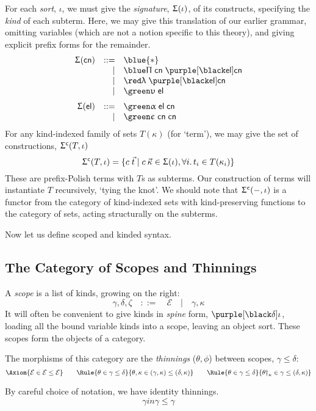\documentclass[natbib]{article}
\newcommand{\type}{\blue{\ast}}
\newcommand{\EC}{\mathcal{E}}
\begin{document}
\newcommand{\Sg}{\Upsigma}
For each \emph{sort}, $\iota$, we must give the \emph{signature}, $\Sg(\iota)$, of its constructs, specifying the \emph{kind} of each subterm. Here, we may give this translation of our earlier grammar, omitting variables (which are not a notion specific to this theory), and giving explicit prefix forms for the remainder.
\[\begin{array}{rrl}
\Sg(\cns) & ::= & \type \\
          &   | & \pic\; \cns\; \bnd\elm\cns \\
          &   | & \lac\; \bnd\elm\cns \\
          &   | & \elc\;\elm \medskip \\
\Sg(\elm) & ::= & \apc\;\elm\;\cns \\
          &   | & \tyc\;\cns\;\cns
\end{array}\]
\newcommand{\Sgc}[2]{\Sg^{\mathsf{c}}(#1,#2)}
For any kind-indexed family of sets $T(\kappa)$ (for `term'), we may give the set of constructions, $\Sgc T\iota$
\[
  \Sgc T\iota = \{c\;\vec{t} \;|\; c\:\vec{\kappa}\in \Sg(\iota), \forall i.\,t_i\in T(\kappa_i)\}
\]
These are prefix-Polish terms with $T$s as subterms. Our construction of terms will instantiate $T$ recursively,
`tying the knot'. We should note that $\Sgc-\iota$ is a functor from the category of kind-indexed sets with kind-preserving
functions to the category of sets, acting structurally on the subterms.

Now let us define scoped and kinded syntax.

\subsection{The Category of Scopes and Thinnings}

A \emph{scope} is a list of kinds, growing on the right:
\[
\gamma, \delta, \zeta \quad::=\quad \EC \quad|\quad \gamma,\kappa
\]
It will often be convenient to give kinds in \emph{spine} form, $\bnd\delta\iota$, loading all the bound variable kinds into a scope, leaving an object sort. These scopes form the objects of a category.

The morphisms of this category are the \emph{thinnings} ($\theta, \phi$) between scopes, $\gamma\le\delta$:
\[
\Axiom{\EC \in \EC\le\EC}
\qquad
\Rule{\theta \in \gamma\le\delta}
     {\theta,\kappa \in (\gamma,\kappa)\le(\delta,\kappa)}
\qquad
\Rule{\theta \in \gamma\le\delta}
     {\theta\dag_\kappa \in \gamma\le(\delta,\kappa)}
\]

By careful choice of notation, we have identity thinnings.
\[
\gamma in \gamma\le\gamma
\]
\end{document}
